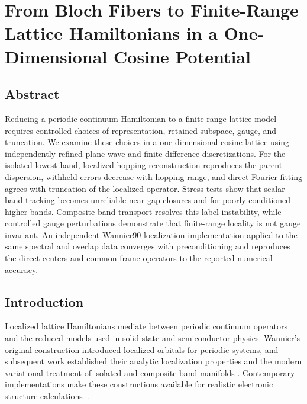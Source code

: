 \chapter[One-Dimensional Bloch-to-Lattice Reduction]{From Bloch Fibers to Finite-Range Lattice Hamiltonians in a One-Dimensional Cosine Potential}

\label{app:one-dimensional-reduction}


\section*{Abstract}

Reducing a periodic continuum Hamiltonian to a finite-range lattice model
requires controlled choices of representation, retained subspace, gauge, and
truncation. We examine these choices in a one-dimensional cosine lattice using
independently refined plane-wave and finite-difference discretizations. For the
isolated lowest band, localized hopping reconstruction reproduces the parent
dispersion, withheld errors decrease with hopping range, and direct Fourier
fitting agrees with truncation of the localized operator. Stress tests show that
scalar-band tracking becomes unreliable near gap closures and for poorly
conditioned higher bands. Composite-band transport resolves this label
instability, while controlled gauge perturbations demonstrate that finite-range
locality is not gauge invariant. An independent Wannier90 localization implementation applied
to the same spectral and overlap data converges with preconditioning and
reproduces the direct centers and common-frame operators to the reported
numerical accuracy.

\section{Introduction}

Localized lattice Hamiltonians mediate between periodic continuum operators and
the reduced models used in solid-state and semiconductor physics. Wannier's
original construction introduced localized orbitals for periodic systems, and
subsequent work established their analytic localization properties and the
modern variational treatment of isolated and composite band manifolds
\cite{wannier1937,kohn1959,marzari1997,souza2001,marzari2012}. Contemporary
implementations make these constructions available for realistic electronic
structure calculations~\cite{pizzi2020}.

